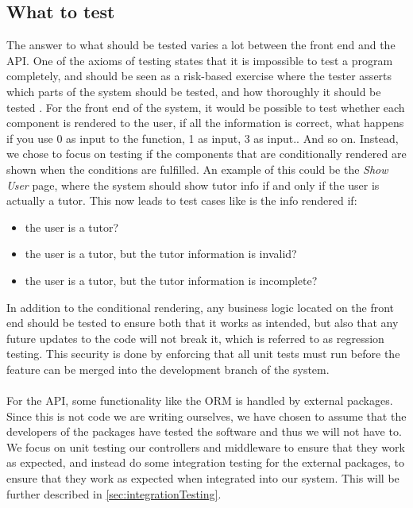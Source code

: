 \subsection{What to test}
The answer to what should be tested varies a lot between the front end and the API.
One of the axioms of testing states that it is impossible to test a program completely, and should be seen as a risk-based exercise where the tester asserts which parts of the system should be tested, and how thoroughly it should be tested \cite{SoftwareTesting}.
For the front end of the system, it would be possible to test whether each component is rendered to the user, if all the information is correct, what happens if you use 0 as input to the function, 1 as input, 3 as input.. And so on.
Instead, we chose to focus on testing if the components that are conditionally rendered are shown when the conditions are fulfilled.
An example of this could be the \textit{Show User} page, where the system should show tutor info if and only if the user is actually a tutor.
This now leads to test cases like is the info rendered if:
\begin{itemize}
    \item the user is a tutor?
    \item the user is a tutor, but the tutor information is invalid?
    \item the user is a tutor, but the tutor information is incomplete?
\end{itemize}
In addition to the conditional rendering, any business logic located on the front end should be tested to ensure both that it works as intended, but also that any future updates to the code will not break it, which is referred to as regression testing.
This security is done by enforcing that all unit tests must run before the feature can be merged into the development branch of the system.
\\\\
For the API, some functionality like the ORM is handled by external packages.
Since this is not code we are writing ourselves, we have chosen to assume that the developers of the packages have tested the software and thus we will not have to.
We focus on unit testing our controllers and middleware to ensure that they work as expected, and instead do some integration testing for the external packages, to ensure that they work as expected when integrated into our system.
This will be further described in \autoref{sec:integrationTesting}.

